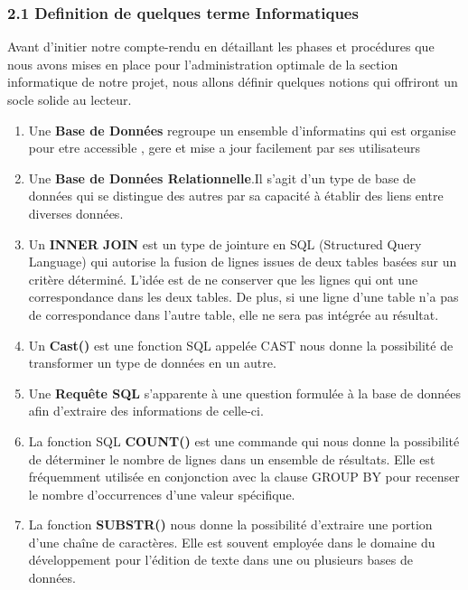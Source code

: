 \documentclass[
]{article}
\begin{document}
\subsubsection{2.1 Definition de quelques terme
Informatiques}\label{definition-de-quelques-terme-informatiques}

Avant d'initier notre compte-rendu en détaillant les phases et
procédures que nous avons mises en place pour l'administration optimale
de la section informatique de notre projet, nous allons définir quelques
notions qui offriront un socle solide au lecteur.

\begin{enumerate}
\def\labelenumi{\arabic{enumi}.}
\item
  Une \textbf{Base de Données} regroupe un ensemble d'informatins qui
  est organise pour etre accessible , gere et mise a jour facilement par
  ses utilisateurs
\item
  Une \textbf{Base de Données Relationnelle}.Il s'agit d'un type de base
  de données qui se distingue des autres par sa capacité à établir des
  liens entre diverses données.
\item
  Un \textbf{INNER JOIN} est un type de jointure en SQL (Structured
  Query Language) qui autorise la fusion de lignes issues de deux tables
  basées sur un critère déterminé. L'idée est de ne conserver que les
  lignes qui ont une correspondance dans les deux tables. De plus, si
  une ligne d'une table n'a pas de correspondance dans l'autre table,
  elle ne sera pas intégrée au résultat.
\item
  Un \textbf{Cast()} est une fonction SQL appelée CAST nous donne la
  possibilité de transformer un type de données en un autre.
\item
  Une \textbf{Requête SQL} s'apparente à une question formulée à la base
  de données afin d'extraire des informations de celle-ci.
\item
  La fonction SQL \textbf{COUNT()} est une commande qui nous donne la
  possibilité de déterminer le nombre de lignes dans un ensemble de
  résultats. Elle est fréquemment utilisée en conjonction avec la clause
  GROUP BY pour recenser le nombre d'occurrences d'une valeur
  spécifique.
\item
  La fonction \textbf{SUBSTR()} nous donne la possibilité d'extraire une
  portion d'une chaîne de caractères. Elle est souvent employée dans le
  domaine du développement pour l'édition de texte dans une ou plusieurs
  bases de données.
\end{enumerate}
\end{document}
